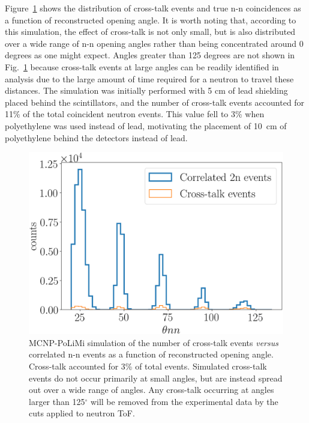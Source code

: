 Figure~\ref{fig:CrosstalkVScoincidence} shows the distribution of cross-talk events and true n-n coincidences as a function of reconstructed opening angle.
It is worth noting that, according to this simulation, the effect of cross-talk is not only small, but is also distributed over a wide range of n-n opening angles rather than being concentrated around 0 degrees as one might expect.
Angles greater than 125 degrees are not shown in Fig.~\ref{fig:CrosstalkVScoincidence} because cross-talk events at large angles can be readily identified in analysis due to the large amount of time required for a neutron to travel these distances.
The simulation was initially performed with 5 cm of lead shielding placed behind the scintillators, and the number of cross-talk events accounted for 11\% of the total coincident neutron events.
This value fell to 3\% when polyethylene was used instead of lead, motivating the placement of 10~cm of polyethylene behind the detectors instead of lead.
\begin{figure}
    \centering
    \includegraphics[width = \figsize\textwidth]{CrosstalkVScoincidence.png}
    \caption{
    MCNP-PoLiMi simulation of the number of cross-talk events \textit{versus} correlated n-n events as a function of reconstructed opening angle.
    Cross-talk accounted for 3\% of total events.
    Simulated cross-talk events do not occur primarily at small angles, but are instead spread out over a wide range of angles.
    Any cross-talk occurring at angles larger than 125$^{\circ}$ will be removed from the experimental data by the cuts applied to neutron ToF.
    }
    \label{fig:CrosstalkVScoincidence}
\end{figure}

